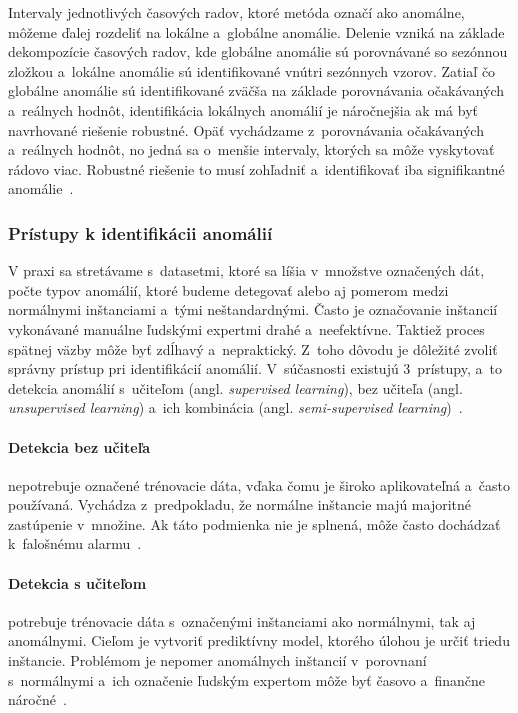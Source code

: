 \documentclass[a4paper,twoside,slovak,12pt,appendix]{article}
\begin{document}
Intervaly jednotlivých časových radov, ktoré metóda označí ako anomálne, môžeme
ďalej rozdeliť na lokálne a~globálne anomálie. Delenie vzniká na základe
dekompozície časových radov, kde globálne anomálie sú porovnávané so
sezónnou zložkou a~lokálne anomálie sú identifikované vnútri sezónnych vzorov.
Zatiaľ čo globálne anomálie sú identifikované zväčša na základe porovnávania
očakávaných a~reálnych hodnôt, identifikácia lokálnych anomálií je náročnejšia
ak má byť navrhované riešenie robustné. Opäť vychádzame z~porovnávania
očakávaných a~reálnych hodnôt, no jedná sa o~menšie intervaly, ktorých sa môže
vyskytovať rádovo viac. Robustné riešenie to musí zohľadniť a~identifikovať iba
signifikantné anomálie~\cite{Kejariwal2015}.


\subsubsection{Prístupy k identifikácii anomálií}
V praxi sa stretávame s~datasetmi, ktoré sa líšia v~množstve označených dát,
počte typov anomálií, ktoré budeme detegovať alebo aj pomerom medzi normálnymi
inštanciami a~tými neštandardnými. Často je označovanie inštancií vykonávané
manuálne ľudskými expertmi drahé a~neefektívne. Taktiež proces spätnej väzby
môže byť zdĺhavý a~nepraktický. Z~toho dôvodu je dôležité zvoliť správny
prístup pri identifikácií anomálií. V~súčasnosti existujú 3~prístupy, a~to
detekcia anomálií s~učiteľom (angl. \textit{supervised learning}), bez učiteľa
(angl. \textit{unsupervised learning}) a~ich kombinácia (angl.
\textit{semi-supervised learning})~\cite{Chandola2009}.

\paragraph{Detekcia bez učiteľa} nepotrebuje označené trénovacie dáta, vďaka
čomu je široko aplikovateľná a~často používaná. Vychádza z~predpokladu, že
normálne inštancie majú majoritné zastúpenie v~množine. Ak táto podmienka nie je
splnená, môže často dochádzať k~falošnému alarmu~\cite{Chandola2009}.

\paragraph{Detekcia s učiteľom} potrebuje trénovacie dáta s~označenými
inštanciami ako normálnymi, tak aj anomálnymi. Cieľom je vytvoriť prediktívny
model, ktorého úlohou je určiť triedu inštancie. Problémom je nepomer anomálnych
inštancií v~porovnaní s~normálnymi a~ich označenie ľudským expertom môže byť
časovo a~finančne náročné~\cite{Chandola2009}.
\end{document}
